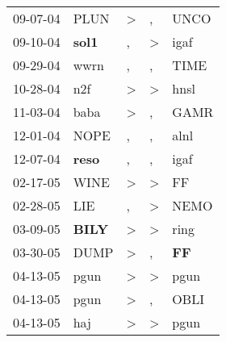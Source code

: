 \begin{supertabular}{p{0.07\textwidth}p{0.06\textwidth}p{0.02\textwidth}p{0.02\textwidth}p{0.06\textwidth}}
          09-07-04\textsuperscript{} &           PLUN\textsuperscript{} &     \textgreater &                , &           UNCO\textsuperscript{} \\
          09-10-04\textsuperscript{} &  \textbf{sol1\textsuperscript{}} &                , &     \textgreater &           igaf\textsuperscript{} \\
          09-29-04\textsuperscript{} &           wwrn\textsuperscript{} &                , &                , &           TIME\textsuperscript{} \\
          10-28-04\textsuperscript{} &            n2f\textsuperscript{} &     \textgreater &     \textgreater &           hnsl\textsuperscript{} \\
          11-03-04\textsuperscript{} &           baba\textsuperscript{} &     \textgreater &                , &           GAMR\textsuperscript{} \\
          12-01-04\textsuperscript{} &           NOPE\textsuperscript{} &                , &                , &           alnl\textsuperscript{} \\
          12-07-04\textsuperscript{} &  \textbf{reso\textsuperscript{}} &                , &                , &           igaf\textsuperscript{} \\
          02-17-05\textsuperscript{} &           WINE\textsuperscript{} &     \textgreater &     \textgreater &             FF\textsuperscript{} \\
          02-28-05\textsuperscript{} &            LIE\textsuperscript{} &                , &     \textgreater &           NEMO\textsuperscript{} \\
          03-09-05\textsuperscript{} &  \textbf{BILY\textsuperscript{}} &     \textgreater &     \textgreater &           ring\textsuperscript{} \\
          03-30-05\textsuperscript{} &           DUMP\textsuperscript{} &     \textgreater &                , &    \textbf{FF\textsuperscript{}} \\
          04-13-05\textsuperscript{} &           pgun\textsuperscript{} &     \textgreater &     \textgreater &           pgun\textsuperscript{} \\
          04-13-05\textsuperscript{} &           pgun\textsuperscript{} &     \textgreater &                , &           OBLI\textsuperscript{} \\
          04-13-05\textsuperscript{} &            haj\textsuperscript{} &     \textgreater &     \textgreater &           pgun\textsuperscript{} \\

\end{supertabular}
